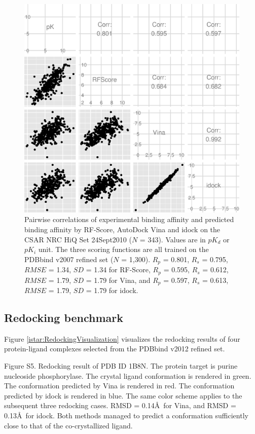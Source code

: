 \begin{figure}
\begin{center}
\includegraphics[width=\linewidth]{../istar/CSAR2010Correlations.eps}
\end{center}
\caption{Pairwise correlations of experimental binding affinity and predicted binding affinity by RF-Score, AutoDock Vina and idock on the CSAR NRC HiQ Set 24Sept2010 ($N$ = 343). Values are in $pK_d$ or $pK_i$ unit. The three scoring functions are all trained on the PDBbind v2007 refined set ($N$ = 1,300). $R_p$ = 0.801, $R_s$ = 0.795, $RMSE$ = 1.34, $SD$ = 1.34 for RF-Score, $R_p$ = 0.595, $R_s$ = 0.612, $RMSE$ = 1.79, $SD$ = 1.79 for Vina, and $R_p$ = 0.597, $R_s$ = 0.613, $RMSE$ = 1.79, $SD$ = 1.79 for idock.}
\label{istar:CSAR2010Correlations}
\end{figure}

\subsection{Redocking benchmark}

Figure \ref{istar:RedockingVisualization} visualizes the redocking results of four protein-ligand complexes selected from the PDBbind v2012 refined set.

Figure S5. Redocking result of PDB ID 1B8N. The protein target is purine nucleoside phosphorylase. The crystal ligand conformation is rendered in green. The conformation predicted by Vina is rendered in red. The conformation predicted by idock is rendered in blue. The same color scheme applies to the subsequent three redocking cases. RMSD = 0.14\AA\ for Vina, and RMSD = 0.13\AA\ for idock. Both methods managed to predict a conformation sufficiently close to that of the co-crystallized ligand.

